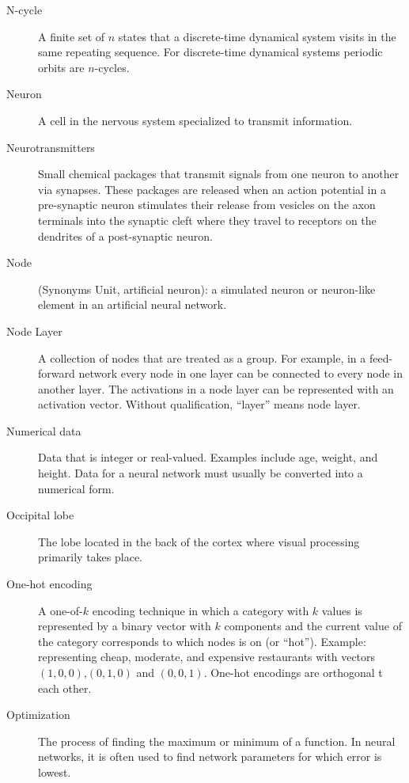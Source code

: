 \begin{description}
\item[N-cycle] A finite set of $n$ states that a discrete-time dynamical system visits in the same repeating sequence. For discrete-time dynamical systems periodic orbits are $n$-cycles.

\item[Neuron] A cell in the nervous system specialized to transmit information.

\item[Neurotransmitters] Small chemical packages that transmit signals from one neuron to another via synapses. These packages are released when an action potential in a pre-synaptic neuron stimulates their release from vesicles on the axon terminals into the synaptic cleft where they travel to receptors on the dendrites of a post-synaptic neuron. 

\item[Node] (Synonyms Unit, artificial neuron): a simulated neuron or neuron-like element in an artificial neural network. 

\item[Node Layer] A collection of nodes that are treated as a group. For example, in a feed-forward network every node in one layer can be connected to every node in another layer. The activations in a node layer can be represented with an activation vector. Without qualification, ``layer'' means node layer.

\item[Numerical data] Data that is integer or real-valued. Examples include age, weight, and height. Data for a neural network must usually be converted into a numerical form.

\item[Occipital lobe] The lobe located in the back of the cortex where visual processing primarily takes place. 

\item[One-hot encoding] A one-of-$k$ encoding technique in which  a category with $k$ values is represented by a binary vector with $k$ components and the current value of the category corresponds to which nodes is on (or ``hot''). Example: representing cheap, moderate, and expensive restaurants with vectors $(1,0,0)$,$(0,1,0)$ and $(0,0,1)$. One-hot encodings are orthogonal t each other.

\item[Optimization] The process of finding the maximum or minimum of a function. In neural networks, it is often used to find network parameters for which error is lowest.


\end{description}
